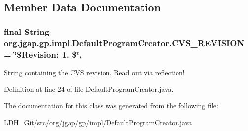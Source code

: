 \subsection{Member Data Documentation}
\hypertarget{classorg_1_1jgap_1_1gp_1_1impl_1_1_default_program_creator_a2e7f40cdb18598054f301598cc037805}{
\subsubsection[{C\-V\-S\-\_\-\-R\-E\-V\-I\-S\-I\-O\-N}]{\setlength{\rightskip}{0pt plus 5cm}final String org.\-jgap.\-gp.\-impl.\-Default\-Program\-Creator.\-C\-V\-S\-\_\-\-R\-E\-V\-I\-S\-I\-O\-N = \char`\"{}\$Revision\-: 1. \$\char`\"{}\hspace{0.3cm}{\ttfamily [static]}, {\ttfamily [private]}}}\label{classorg_1_1jgap_1_1gp_1_1impl_1_1_default_program_creator_a2e7f40cdb18598054f301598cc037805}
String containing the C\-V\-S revision. Read out via reflection! 

Definition at line 24 of file Default\-Program\-Creator.\-java.



The documentation for this class was generated from the following file\-:\begin{DoxyCompactItemize}
\item 
L\-D\-H\-\_\-\-Git/src/org/jgap/gp/impl/\hyperlink{_default_program_creator_8java}{Default\-Program\-Creator.\-java}\end{DoxyCompactItemize}
